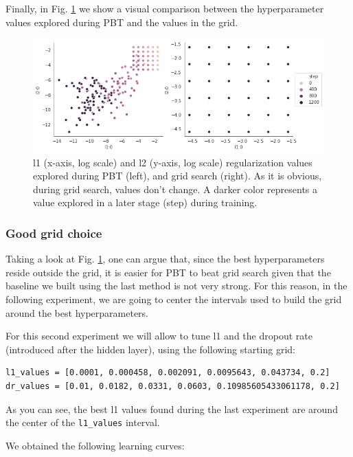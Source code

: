 \documentclass{article}
\begin{document}
Finally, in Fig. \ref{fig:evol} we show a visual comparison between the hyperparameter values explored during PBT and the values in the grid.

\begin{figure}[H]
    \label{fig:evol}
    \centering
    \includegraphics[width=\textwidth,height=\textheight,keepaspectratio]{hyperparameter_evolution.png}
    \caption{l1 (x-axis, log scale) and l2 (y-axis, log scale) regularization values explored during PBT (left), and grid search (right). As it is obvious, during grid search, values don't change. A darker color represents a value explored in a later stage (step) during training.}
\end{figure}

\subsubsection{Good grid choice}
\label{sec:goodgrid}

Taking a look at Fig. \ref{fig:evol}, one can argue that, since the best hyperparameters reside outside the grid, it is easier for PBT to beat grid search given that the baseline we built using the last method is not very strong. For this reason, in the following experiment, we are going to center the intervals used to build the grid around the best hyperparameters.

For this second experiment we will allow to tune l1 and the dropout rate (introduced after the hidden layer), using the following starting grid:

\begin{verbatim}
l1_values = [0.0001, 0.000458, 0.002091, 0.0095643, 0.043734, 0.2]
dr_values = [0.01, 0.0182, 0.0331, 0.0603, 0.10985605433061178, 0.2]
\end{verbatim}

As you can see, the best l1 values found during the last experiment are around the center of the \texttt{l1\_values} interval.

We obtained the following learning curves:
\end{document}
